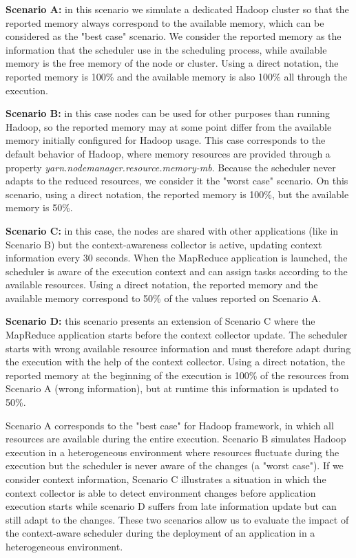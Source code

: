 \textbf{Scenario A:} in this scenario we simulate a dedicated Hadoop cluster so that the reported memory always correspond to the available memory, which can be considered as the "best case" scenario. We consider the reported memory as the information that the scheduler use in the scheduling process, while available memory is the free memory of the node or cluster. Using a direct notation, the reported memory is 100\% and the available memory is also 100\% all through the execution.

\textbf{Scenario B:} in this case nodes can be used for other purposes than running Hadoop, so the reported memory may at some point differ from the available memory initially configured for Hadoop usage. This case corresponds to the default behavior of Hadoop, where memory resources are provided through a property \textit{yarn.nodemanager.resource.memory-mb}. Because the scheduler never adapts to the reduced resources, we consider it the "worst case" scenario. On this scenario, using a direct notation, the reported memory is 100\%, but the available memory is 50\%. 

\textbf{Scenario C:} in this case, the nodes are shared with other applications (like in Scenario B) but the context-awareness collector is active, updating context information every 30 seconds. When the MapReduce application is launched, the scheduler is aware of the execution context and can assign tasks according to the available resources. Using a direct notation, the reported memory and the available memory correspond to 50\% of the values reported on Scenario A.

\textbf{Scenario D:} this scenario presents an extension of Scenario C where the MapReduce application starts before the context collector update. The scheduler starts with wrong available resource information and must therefore adapt during the execution with the help of the context collector. Using a direct notation, the reported memory at the beginning of the execution is 100\% of the resources from Scenario A (wrong information), but at runtime this information is updated to 50\%. 

Scenario A corresponds to the "best case" for Hadoop framework, in which all resources are available during the entire execution. Scenario B simulates Hadoop execution in a heterogeneous environment where resources fluctuate during the execution but the scheduler is never aware of the changes (a "worst case"). If we consider context information, Scenario C illustrates a situation in which the context collector is able to detect environment changes before application execution starts while scenario D suffers from late information update but can still adapt to the changes. These two scenarios allow us to evaluate the impact of the context-aware scheduler during the deployment of an application in a heterogeneous environment.   

